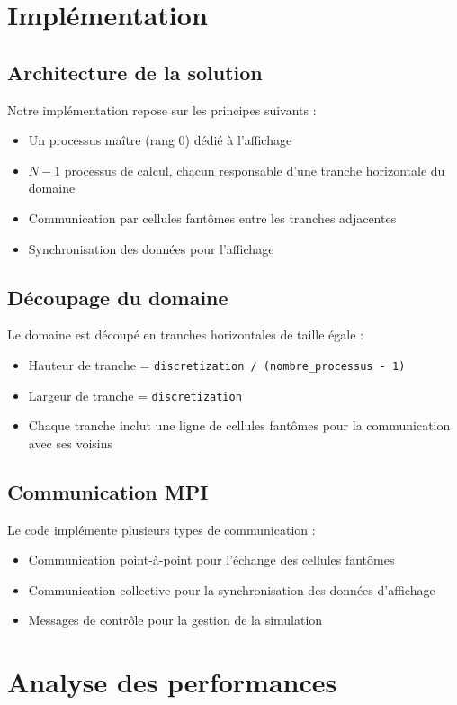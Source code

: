 \documentclass[11pt]{article}
\begin{document}
\section{Implémentation}

\subsection{Architecture de la solution}
Notre implémentation repose sur les principes suivants :
\begin{itemize}
    \item Un processus maître (rang 0) dédié à l'affichage
    \item \(N-1\) processus de calcul, chacun responsable d'une tranche horizontale du domaine
    \item Communication par cellules fantômes entre les tranches adjacentes
    \item Synchronisation des données pour l'affichage
\end{itemize}

\subsection{Découpage du domaine}
Le domaine est découpé en tranches horizontales de taille égale :
\begin{itemize}
    \item Hauteur de tranche = \texttt{discretization / (nombre\_processus - 1)}
    \item Largeur de tranche = \texttt{discretization}
    \item Chaque tranche inclut une ligne de cellules fantômes pour la communication avec ses voisins
\end{itemize}

\subsection{Communication MPI}
Le code implémente plusieurs types de communication :
\begin{itemize}
    \item Communication point-à-point pour l'échange des cellules fantômes
    \item Communication collective pour la synchronisation des données d'affichage
    \item Messages de contrôle pour la gestion de la simulation
\end{itemize}

\section{Analyse des performances}
\end{document}
